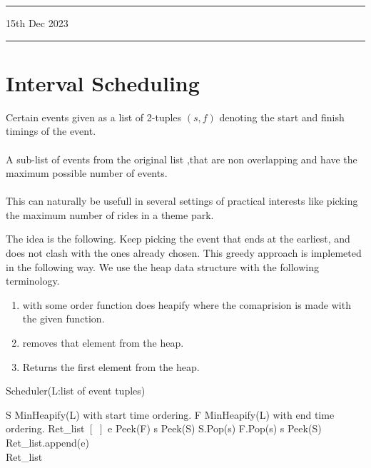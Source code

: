 \documentclass{myclass}
\begin{document}
\hrule
\vspace{-0.15cm}
\begin{flushleft}
    15th Dec 2023
\end{flushleft}
\vspace{-0.15cm}
\hrule

\section*{Interval Scheduling}

 Certain events given as a list of 2-tuples $(s,f)$ denoting
the start and finish timings of the event. 
\\\\
 A sub-list of events from the original list ,that are non overlapping
and have the maximum possible number of events.
\\\\
This can naturally be usefull in several settings of practical interests like
picking the maximum number of rides in a theme park.

\newpage

The idea is the following. Keep picking the event that ends at the earliest, and does not clash with the ones already 
chosen. This greedy approach is implemeted in the following way. We use the heap data structure with the following terminology.

\begin{enumerate}
    \item {} with some order function does heapify where the comaprision is made with the given function.
    \item {} removes that element from the heap.
    \item {} Returns the first element from the heap.
\end{enumerate}

\begin{algorithm}
    \caption*{Scheduler(L:list of event tuples)}
    \begin{algorithmic}[1]
        \State S \ass MinHeapify(L) with start time ordering.
        \State F \ass MinHeapify(L) with end time ordering.
        \State Ret\_list \ass $[\,\,]$
            \State e \ass Peek(F)
            \State s \ass Peek(S)
                \State S.Pop(s)
                \State F.Pop(s)
                \State s \ass Peek(S)
            \EndWhile
            \State Ret\_list.append(e)
        \EndWhile\\
         Ret\_list
    \end{algorithmic}
\end{algorithm}
\end{document}
